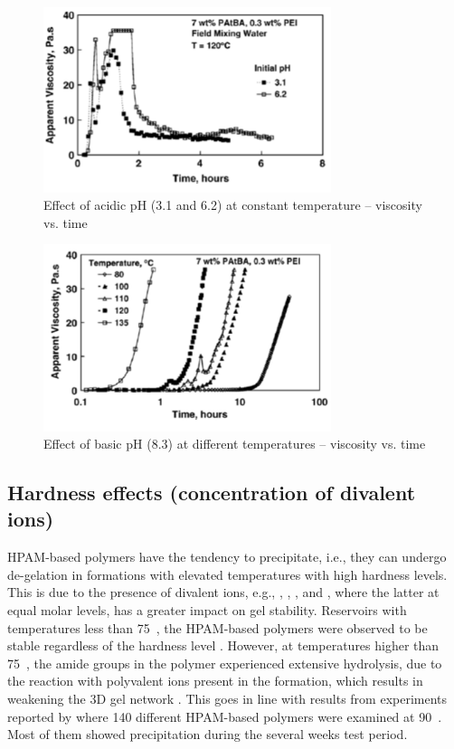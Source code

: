 \begin{figure}
    \centering
    \includegraphics[width=0.75\textwidth]{img/fig/almuntasheriAcidicpH.png}
    \caption{Effect of acidic pH (3.1 and 6.2) at constant temperature – viscosity vs. time \citep{Al-Muntasheri2007}}
    \label{fig:almuntasheriAcidicpH} %
\end{figure}

\begin{figure}
    \centering
    \includegraphics[width=0.75\textwidth]{img/fig/almuntasheriBasicpH.png}
    \caption{Effect of basic pH (8.3) at different temperatures – viscosity vs. time \citep{Al-Muntasheri2007}}
    \label{fig:almuntasheriBasicpH} %
\end{figure}

\subsection{Hardness effects (concentration of divalent ions)}

HPAM-based polymers have the tendency to precipitate, i.e., they can undergo de-gelation in formations with elevated temperatures with high hardness levels. This is due to the presence of divalent ions, e.g., , , , and , where the latter at equal molar levels, has a greater impact on gel stability. Reservoirs with temperatures less than 75~\celsius, the HPAM-based polymers were observed to be stable regardless of the hardness level \citep{Moradi1987}. However, at temperatures higher than 75~\celsius, the amide groups in the polymer experienced extensive hydrolysis, due to the reaction with polyvalent ions present in the formation, which results in weakening the 3D gel network \citep{Al-Muntasheri2012, Stahl1988}. This goes in line with results from experiments reported by \citet{Davison1982} where 140 different HPAM-based polymers were examined at 90~\celsius. Most of them showed precipitation during the several weeks test period.


